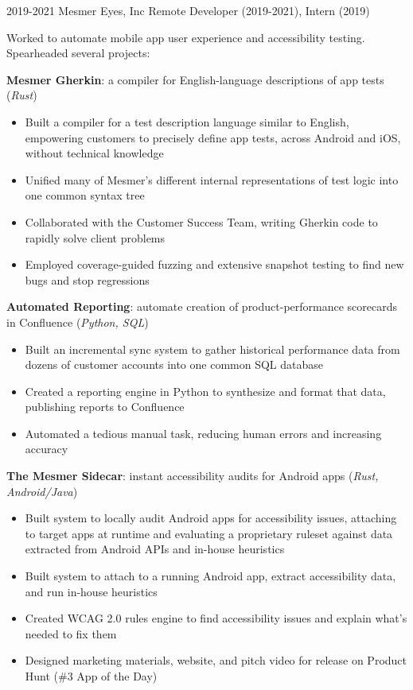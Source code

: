 \documentclass[letterpaper,10pt]{article}
\begin{document}
\work
{2019-2021}
{Mesmer Eyes, Inc}
{Remote}
{Developer (2019-2021), Intern (2019)}
{
	Worked to automate mobile app user experience and accessibility testing. Spearheaded several projects:

	\vbeat
	\textbf{Mesmer Gherkin}:
	a compiler for English-language descriptions of app tests
	(\textit{Rust})

	\begin{itemize}
	\item Built a compiler for a test description language similar to English, empowering customers to precisely define app tests, across Android and iOS, without technical knowledge
	\item Unified many of Mesmer's different internal representations of test logic into one common syntax tree
	\item Collaborated with the Customer Success Team, writing Gherkin code to rapidly solve client problems
	\item Employed coverage-guided fuzzing and extensive snapshot testing to find new bugs and stop regressions
	\end{itemize}

	\vbeat
	\textbf{Automated Reporting}: automate creation of product-performance scorecards in Confluence
	(\textit{Python, SQL})

	\begin{itemize}
	\item Built an incremental sync system to gather historical performance data from dozens of customer accounts into one common SQL database
	\item Created a reporting engine in Python to synthesize and format that data, publishing reports to Confluence
	\item Automated a tedious manual task, reducing human errors and increasing accuracy
	\end{itemize}

    \vbeat
	\textbf{The Mesmer Sidecar}:
	instant accessibility audits for Android apps
	(\textit{Rust, Android/Java})

	\begin{itemize}
	\item Built system to locally audit Android apps for accessibility issues, attaching to target apps at runtime and evaluating a proprietary ruleset against data extracted from Android APIs and in-house heuristics
	\item Built system to attach to a running Android app, extract accessibility data, and run in-house heuristics
	\item Created WCAG 2.0 rules engine to find accessibility issues and explain what's needed to fix them
	\item Designed marketing materials, website, and pitch video for release on Product Hunt (\#3 App of the Day)
	\end{itemize}

}
\end{document}
